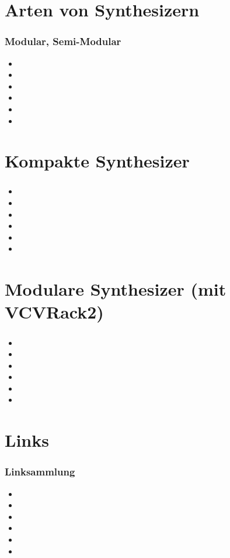 \documentclass[11pt,ngerman]{beamer}
\begin{document}
\section{Arten von Synthesizern}
 
\begin{frame}
\frametitle{Modular, Semi-Modular}

\begin{itemize}
\item 
\item 
\item 
\item 
\item 
\item 
\end{itemize}
\end{frame}

\section{Kompakte Synthesizer}
 
\begin{frame}
\frametitle{}


\begin{itemize}
\item 
\item 
\item 
\item 
\item 
\item 
\end{itemize}
\end{frame}
 
\section{Modulare Synthesizer (mit VCVRack2)} 
 
\begin{frame}
\frametitle{}


\begin{itemize}
\item 
\item 
\item 
\item 
\item 
\item 
\end{itemize}
\end{frame} 
 
\section{Links} 
 
\begin{frame}
\frametitle{Linksammlung}


\begin{itemize}
\item 
\item 
\item 
\item 
\item 
\item 
\end{itemize}
\end{frame} 
 
 
 
\end{document}
